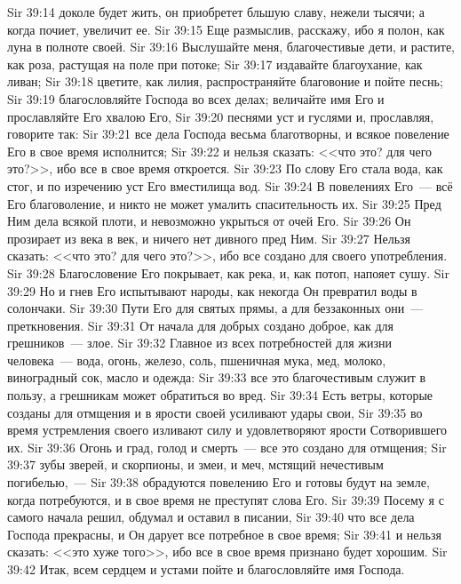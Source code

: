 \vs Sir 39:14 доколе будет жить, он приобретет бльшую славу, нежели тысячи; а когда почиет, увеличит ее.
\rsbpar\vs Sir 39:15 Еще размыслив, расскажу, ибо я полон, как луна в полноте своей.
\vs Sir 39:16 Выслушайте меня, благочестивые дети, и растите, как роза, растущая на поле при потоке;
\vs Sir 39:17 издавайте благоухание, как ливан;
\vs Sir 39:18 цветите, как лилия, распространяйте благовоние и пойте песнь;
\vs Sir 39:19 благословляйте Господа во всех делах; величайте имя Его и прославляйте Его хвалою Его,
\vs Sir 39:20 песнями уст и гуслями и, прославляя, говорите так:
\vs Sir 39:21 все дела Господа весьма благотворны, и всякое повеление Его в свое время исполнится;
\vs Sir 39:22 и нельзя сказать: <<что это? для чего это?>>, ибо все в свое время откроется.
\vs Sir 39:23 По слову Его стала вода, как стог, и по изречению уст Его  вместилища вод.
\vs Sir 39:24 В повелениях Его~--- всё Его благоволение, и никто не может умалить спасительность их.
\vs Sir 39:25 Пред Ним дела всякой плоти, и невозможно укрыться от очей Его.
\vs Sir 39:26 Он прозирает из века в век, и ничего нет дивного пред Ним.
\vs Sir 39:27 Нельзя сказать: <<что это? для чего это?>>, ибо все создано для своего употребления.
\vs Sir 39:28 Благословение Его покрывает, как река, и, как потоп, напояет сушу.
\vs Sir 39:29 Но и гнев Его испытывают народы, как некогда Он превратил воды в солончаки.
\vs Sir 39:30 Пути Его для святых прямы, а для беззаконных они~--- преткновения.
\vs Sir 39:31 От начала для добрых создано доброе, как для грешников~--- злое.
\vs Sir 39:32 Главное из всех потребностей для жизни человека~--- вода, огонь, железо, соль, пшеничная мука, мед, молоко, виноградный сок, масло и одежда:
\vs Sir 39:33 все это благочестивым служит в пользу, а грешникам может обратиться во вред.
\vs Sir 39:34 Есть ветры, которые созданы для отмщения и в ярости своей усиливают удары свои,
\vs Sir 39:35 во время устремления своего изливают силу и удовлетворяют ярости Сотворившего их.
\vs Sir 39:36 Огонь и град, голод и смерть~--- все это создано для отмщения;
\vs Sir 39:37 зубы зверей, и скорпионы, и змеи, и меч, мстящий нечестивым погибелью,~---
\vs Sir 39:38 обрадуются повелению Его и готовы будут на земле, когда потребуются, и в свое время не преступят слова Его.
\vs Sir 39:39 Посему я с самого начала решил, обдумал и оставил в писании,
\vs Sir 39:40 что все дела Господа прекрасны, и Он дарует все потребное в свое время;
\vs Sir 39:41 и нельзя сказать: <<это хуже того>>, ибо все в свое время признано будет хорошим.
\vs Sir 39:42 Итак, всем сердцем и устами пойте и благословляйте имя Господа.
